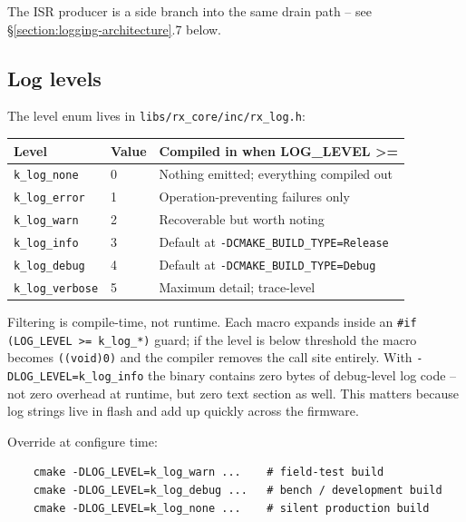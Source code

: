 The ISR producer is a side branch into the same drain path -- see
\S\ref{section:logging-architecture}.7 below.

\subsection{Log levels}

The level enum lives in
\texttt{libs/rx\_core/inc/rx\_log.h}:

\begin{center}
\begin{tabular}{|l|l|p{7.5cm}|}
\hline
\textbf{Level}            & \textbf{Value} & \textbf{Compiled in when LOG\_LEVEL >=} \\
\hline
\texttt{k\_log\_none}     & 0              & Nothing emitted; everything compiled out             \\
\texttt{k\_log\_error}    & 1              & Operation-preventing failures only                   \\
\texttt{k\_log\_warn}     & 2              & Recoverable but worth noting                         \\
\texttt{k\_log\_info}     & 3              & Default at \texttt{-DCMAKE\_BUILD\_TYPE=Release}     \\
\texttt{k\_log\_debug}    & 4              & Default at \texttt{-DCMAKE\_BUILD\_TYPE=Debug}       \\
\texttt{k\_log\_verbose}  & 5              & Maximum detail; trace-level                          \\
\hline
\end{tabular}
\end{center}

Filtering is compile-time, not runtime. Each macro expands inside an
\texttt{\#if (LOG\_LEVEL >= k\_log\_*)} guard; if the level is below
threshold the macro becomes \texttt{((void)0)} and the compiler removes
the call site entirely. With
\texttt{-DLOG\_LEVEL=k\_log\_info} the binary contains zero bytes of
debug-level log code -- not zero overhead at runtime, but zero text
section as well. This matters because log strings live in flash and
add up quickly across the firmware.

Override at configure time:

\begin{verbatim}
    cmake -DLOG_LEVEL=k_log_warn ...    # field-test build
    cmake -DLOG_LEVEL=k_log_debug ...   # bench / development build
    cmake -DLOG_LEVEL=k_log_none ...    # silent production build
\end{verbatim}

